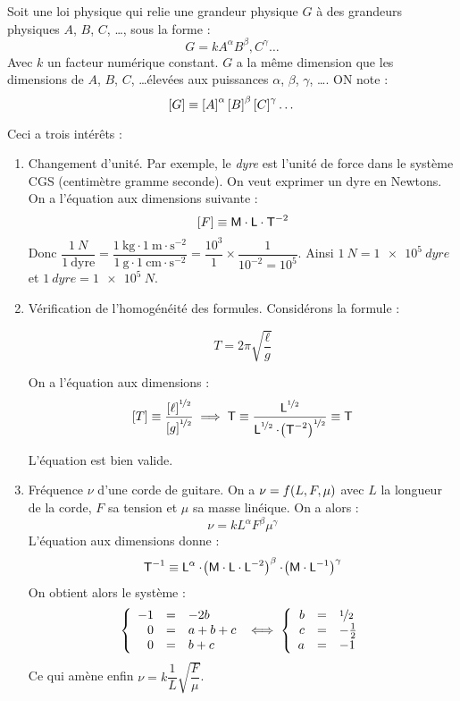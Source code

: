 \documentclass[a4paper,french,bookmarks]{book}
\begin{document}
    Soit une loi physique qui relie une grandeur physique $G$ à des grandeurs physiques $A$, $B$, $C$, \dots, sous la forme :
    \[ G = k A^\alpha B^\beta, C^\gamma \dots\]
    Avec $k$ un facteur numérique constant. $G$ a la même dimension que les dimensions de $A$, $B$, $C$, \dots élevées aux puissances $\alpha$, $\beta$, $\gamma$, \dots. ON note :
    \[ \left[G\right] \equiv \left[A\right]^\alpha \left[B\right]^\beta \left[C\right]^\gamma \dots\]
    
    Ceci a trois intérêts :
    \begin{enumerate}
        \item Changement d'unité. Par exemple, le \textit{dyre} est l'unité de force dans le système \textsc{CGS} (centimètre gramme seconde). On veut exprimer un dyre en Newtons. On a l'équation aux dimensions suivante :
        \[ \left[F\right] \equiv \textsf{M} \cdot \textsf{L} \cdot \textsf{T}^{-2}\]
        Donc $\dfrac{\SI{1}{N}}{1 \ \text{dyre}} = \dfrac{\SI{1}{\kg} \cdot \SI{1}{\m\cdot\second^{-2}}}{\SI{1}{\g}\cdot \SI{1}{\cm \cdot \second^{-2}}} = \dfrac{10^3}{1} \times \dfrac{1}{10^{-2} = 10^5}$. Ainsi $\SI{1}{N} = \SI{1e5}{dyre}$ et $\SI{1}{dyre} = \SI{1e5}{N}$.
        
        \item Vérification de l'homogénéité des formules. Considérons la formule :
        
        \[ T = 2\pi \sqrt{\dfrac{\ell}{g}}\]
        
        On a l'équation aux dimensions :
        \[ \left[T\right] \equiv \dfrac{\left[\ell\right]^{\nicefrac{1}{2}}}{\left[g\right]^{\nicefrac{1}{2}}} \implies \textsf{T} \equiv \dfrac{\textsf{L}^{\nicefrac{1}{2}}}{\textsf{L}^{\nicefrac{1}{2}}\cdot \!\left(\textsf{T}^{-2}\right)^{\nicefrac{1}{2}}} \equiv \textsf{T}\]
        
        L'équation est bien valide.
        
        \item Fréquence $\nu$ d'une corde de guitare. On a $\nu = f\!\left(L, F, \mu\right)$ avec $L$ la longueur de la corde, $F$ sa tension et $\mu$ sa masse linéique. On a alors :
        \[ \nu = kL^\alpha F^\beta \mu^\gamma\]
        L'équation aux dimensions donne :
        \[ \textsf{T}^{-1} \equiv \textsf{L}^{\alpha} \cdot \!\left(\textsf{M} \cdot \textsf{L} \cdot \textsf{L}^{-2}\right)^\beta \cdot \!\left(\textsf{M} \cdot \textsf{L}^{-1}\right)^\gamma\]
        On obtient alors le système :
        \[ \left\lbrace\begin{array}{rcl}
            -1 &=& -2b  \\
            0 &=& a + b + c\\
            0 &=& b + c
        \end{array}\right. \iff \left\lbrace\begin{array}{rcl}
            b &=& \nicefrac{1}{2}  \\
            c &=& -\frac{1}{2}\\
            a &=& -1
        \end{array}\right. \]
        Ce qui amène enfin $\nu = k\dfrac{1}{L}\sqrt{\dfrac{F}{\mu}}$.
        

\end{enumerate}
\end{document}
